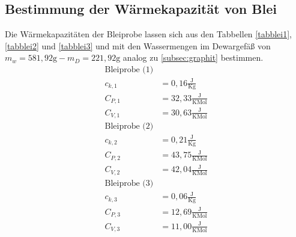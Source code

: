 \subsection{Bestimmung der Wärmekapazität von Blei} \label{subsec:blei}
  
Die Wärmekapazitäten der Bleiprobe lassen sich aus den Tabbellen \ref{tabblei1}, \ref{tabblei2} und 
\ref{tabblei3} und mit den Wassermengen im Dewargefäß von $m_w=581,92\text{g}-m_D=221,92\text{g}$ 
analog zu \ref{subsec:graphit} bestimmen.
\begin{align}
\text{Bleiprobe (1)}\nonumber \\
c_{k,1}&=0,16 \frac{\text{J}}{\text{K} \text{g}} \\
C_{P,1}&=32,33 \frac{\text{J}}{\text{K} \text{Mol}} \\
C_{V,1}&=30,63  \frac{\text{J}}{\text{K} \text{Mol}} \\
\text{Bleiprobe (2)}\nonumber \\
c_{k,2}&=0,21 \frac{\text{J}}{\text{K} \text{g}} \\
C_{P,2}&=43,75 \frac{\text{J}}{\text{K} \text{Mol}} \\
C_{V,2}&=42,04  \frac{\text{J}}{\text{K} \text{Mol}} \\
\text{Bleiprobe (3)}\nonumber \\
c_{k,3}&=0,06 \frac{\text{J}}{\text{K} \text{g}} \\
C_{P,3}&=12,69 \frac{\text{J}}{\text{K} \text{Mol}} \\
C_{V,3}&=11,00  \frac{\text{J}}{\text{K} \text{Mol}} 
\end{align}


